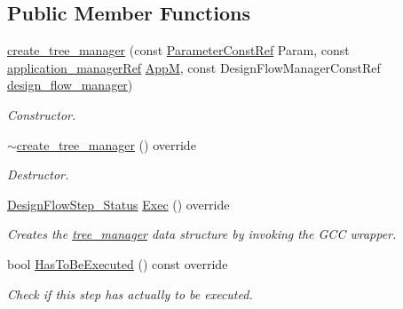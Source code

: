 \subsection*{Public Member Functions}
\begin{DoxyCompactItemize}
\item 
\hyperlink{classcreate__tree__manager_a1e50044ecf7bfd389dd32e792945ea78}{create\+\_\+tree\+\_\+manager} (const \hyperlink{Parameter_8hpp_a37841774a6fcb479b597fdf8955eb4ea}{Parameter\+Const\+Ref} Param, const \hyperlink{application__manager_8hpp_a04ccad4e5ee401e8934306672082c180}{application\+\_\+manager\+Ref} \hyperlink{classFrontendFlowStep_a0ac0d8db2a378416583f51c4faa59d15}{AppM}, const Design\+Flow\+Manager\+Const\+Ref \hyperlink{classDesignFlowStep_ab770677ddf087613add30024e16a5554}{design\+\_\+flow\+\_\+manager})
\begin{DoxyCompactList}\small\item\em Constructor. \end{DoxyCompactList}\item 
\hyperlink{classcreate__tree__manager_a16354da68ac6b4b1a280d153aeb916fa}{$\sim$create\+\_\+tree\+\_\+manager} () override
\begin{DoxyCompactList}\small\item\em Destructor. \end{DoxyCompactList}\item 
\hyperlink{design__flow__step_8hpp_afb1f0d73069c26076b8d31dbc8ebecdf}{Design\+Flow\+Step\+\_\+\+Status} \hyperlink{classcreate__tree__manager_a1703cbe6a6f2df1ca3ef7809e8682fac}{Exec} () override
\begin{DoxyCompactList}\small\item\em Creates the \hyperlink{classtree__manager}{tree\+\_\+manager} data structure by invoking the G\+CC wrapper. \end{DoxyCompactList}\item 
bool \hyperlink{classcreate__tree__manager_ab0dc851ab662326a6d0a5ecfeba7d663}{Has\+To\+Be\+Executed} () const override
\begin{DoxyCompactList}\small\item\em Check if this step has actually to be executed. \end{DoxyCompactList}\end{DoxyCompactItemize}
